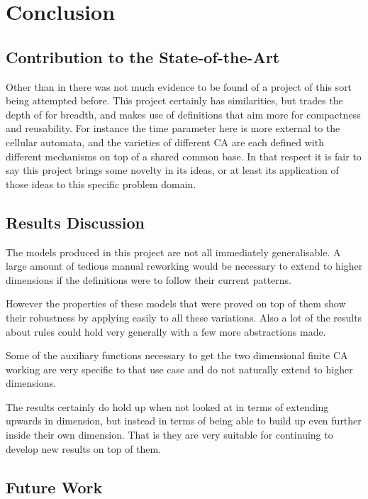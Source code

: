 \chapter{Conclusion}

\section{Contribution to the State-of-the-Art}

Other than in \cite{firing} there was not much evidence to be found of a project of this sort being attempted before.
This project certainly has similarities,
but trades the depth of \cite{firing} for breadth,
and makes use of definitions that aim more for compactness and reusability.
For instance the time parameter here is more external to the cellular automata,
and the varieties of different CA are each defined with different mechanisms on top of a shared common base.
In that respect it is fair to say this project brings some novelty in its ideas,
or at least its application of those ideas to this specific problem domain.


\section{Results Discussion}

The models produced in this project are not all immediately generalisable. 
A large amount of tedious manual reworking would be necessary to extend to higher dimensions if the definitions were to follow their current patterns.

However the properties of these models that were proved on top of them show their robustness by applying easily to all these variations.
Also a lot of the results about rules could hold very generally with a few more abstractions made.

Some of the auxiliary functions necessary to get the two dimensional finite CA working are very specific to that use case and do not naturally extend to higher dimensions.

The results certainly do hold up when not looked at in terms of extending upwards in dimension,
but instead in terms of being able to build up even further inside their own dimension.
That is they are very suitable for continuing to develop new results on top of them.


\section{Future Work}

